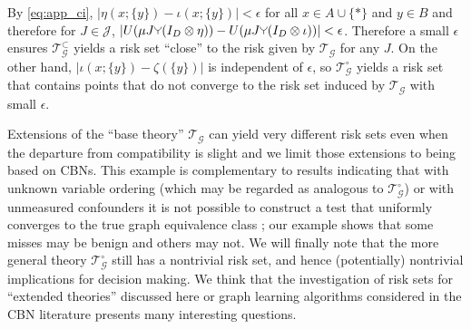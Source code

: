 \begin{example}
By \ref{eq:app_ci}, $|\eta(x;\{y\})-\iota(x;\{y\})|<\epsilon$ for all $x\in A\cup\{*\}$ and $y\in B$ and therefore for $J\in \mathscr{J}$, $|U(\mu J\splitter{0.1} (I_D\otimes \eta)) - U(\mu J\splitter{0.1} (I_D\otimes \iota))|<\epsilon$. Therefore a small $\epsilon$ ensures $\mathscr{T}^\subset_{\mathcal{G}}$ yields a risk set ``close'' to the risk given by $\mathscr{T}_{\mathcal{G}}$ for any $J$. On the other hand, $|\iota(x;\{y\})-\zeta(\{y\})|$ is independent of $\epsilon$, so $\mathscr{T}^\circ_{\mathcal{G}}$ yields a risk set that contains points that do not converge to the risk set induced by $\mathscr{T}_{\mathcal{G}}$ with small $\epsilon$.
\end{example}

Extensions of the ``base theory'' $\mathscr{T}_{\mathcal{G}}$ can yield very different risk sets even when the departure from compatibility is slight and we limit those extensions to being based on CBNs. This example is complementary to results indicating that with unknown variable ordering (which may be regarded as analogous to $\mathscr{T}_{\mathcal{G}}^\circ$) or with unmeasured confounders it is not possible to construct a test that uniformly converges to the true graph equivalence class \citep{robins_uniform_2003,zhang_strong_2003}; our example shows that some misses may be benign and others may not. We will finally note that the more general theory $\mathscr{T}^\circ_{\mathcal{G}}$ still has a nontrivial risk set, and hence (potentially) nontrivial implications for decision making. We think that the investigation of risk sets for ``extended theories'' discussed here or graph learning algorithms considered in the CBN literature presents many interesting questions.